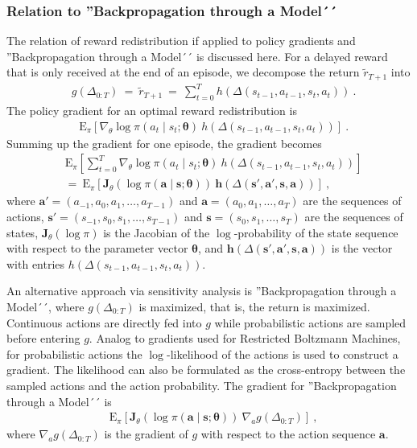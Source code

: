 \documentclass{article}
\newcommand\Ba{\bm{a}}
\newcommand\Bh{\bm{h}}
\newcommand\Bs{\bm{s}}
\newcommand\BJ{\bm{J}}
\newcommand\Bth{\bm{\theta}}
\newcommand\EXP{\mathbf{\mathrm{E}}}
\begin{document}
\begin{appendices}
\subsubsection{Relation to ''Backpropagation through a Model´´}
The relation of reward redistribution if applied to policy gradients
and ''Backpropagation through a Model´´ is discussed here.
For a delayed reward that is only received at the end of an episode, 
we decompose the return $\tilde{r}_{T+1}$ into
\begin{align}
  &g(\Delta_{0:T}) \ = \ \tilde{r}_{T+1} \ = \ \sum_{t=0}^T h(\Delta(s_{t-1},a_{t-1},s_t,a_t)) \ . 
\end{align}
The policy gradient for an optimal reward redistribution is
\begin{align}
  &\EXP_{\pi}\left[ \nabla_{\theta} \log \pi(a_t \mid
   s_t;\Bth) \ h(\Delta(s_{t-1},a_{t-1},s_t,a_t))  \right]  \ . 
\end{align} 
Summing up the gradient for one episode, the gradient becomes 
\begin{align}
  &\EXP_{\pi}\left[ \sum_{t=0}^T \nabla_{\theta} \log \pi(a_t \mid
   s_t;\Bth) \ h(\Delta(s_{t-1},a_{t-1},s_t,a_t))  \right] \\ \nonumber
   &=  \ \EXP_{\pi}\left[  \BJ_{\theta}(\log \pi( \Ba \mid \Bs;\Bth)) \ 
   \Bh(\Delta(\Bs',\Ba',\Bs,\Ba))  \right]  \ , 
\end{align} 
where  $\Ba'=(a_{-1},a_0,a_1,\ldots,a_{T-1})$ 
and $\Ba=(a_0,a_1,\ldots,a_T)$ are the sequences of actions, 
$\Bs'=(s_{-1},s_0,s_1,\ldots,s_{T-1})$ and $\Bs=(s_0,s_1,\ldots,s_T)$ 
are the sequences of states,
$\BJ_{\theta}(\log \pi)$ is the Jacobian of the $\log$-probability of the 
state sequence with respect to the parameter vector $\Bth$,
and $\Bh(\Delta(\Bs',\Ba',\Bs,\Ba))$ is the vector with
entries $h(\Delta(s_{t-1},a_{t-1},s_t,a_t))$. 

An alternative approach via sensitivity analysis is ''Backpropagation through a Model´´, 
where $g(\Delta_{0:T})$ is maximized, that is, the return is maximized.
Continuous actions are directly fed into $g$ while probabilistic actions are 
sampled before entering $g$. Analog to gradients used for Restricted Boltzmann Machines,
for probabilistic actions the $\log$-likelihood of the actions is used to construct a gradient.
The likelihood can also be formulated as the cross-entropy
between the sampled actions and the action probability.
The gradient for ''Backpropagation through a Model´´ is
\begin{align}
  &\EXP_{\pi}\left[ \BJ_{\theta}(\log \pi( \Ba \mid \Bs;\Bth)) \ 
  \nabla_{a}  g(\Delta_{0:T})  \right] \ , 
\end{align} 
where $\nabla_{a}  g(\Delta_{0:T})$ is the gradient of $g$ with respect to the action sequence $\Ba$. 


\end{appendices}
\end{document}
